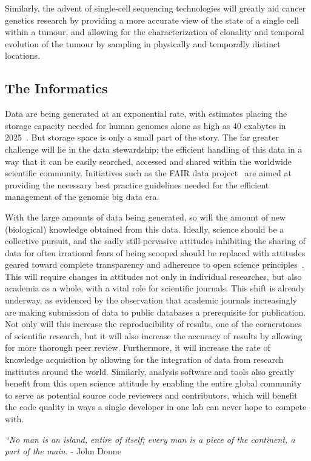 Similarly, the advent of single-cell sequencing technologies will greatly aid cancer genetics research by providing a more accurate view of the state of a single cell within a tumour, and allowing for the characterization of clonality and temporal evolution of the tumour by sampling in physically and temporally distinct locations.


\subsection{The Informatics}
Data are being generated at an exponential rate, with estimates placing the storage capacity needed for human genomes alone as high as 40 exabytes in 2025~\cite{stephens2015}. But storage space is only a small part of the story. The far greater challenge will lie in the data stewardship; the efficient handling of this data in a way that it can be easily searched, accessed and shared within the worldwide scientific community. Initiatives such as the FAIR data project~\cite{wilkinson2016fair} are aimed at providing the necessary best practice guidelines needed for the efficient management of the genomic big data era.


With the large amounts of data being generated, so will the amount of new (biological) knowledge obtained from this data. Ideally, science should be a collective pursuit, and the sadly still-pervasive attitudes inhibiting the sharing of data for often irrational fears of being scooped should be replaced with attitudes geared toward complete transparency and adherence to open science principles~\cite{TODO}. This will require changes in attitudes not only in individual researches, but also academia as a whole, with a vital role for scientific journals. This shift is already underway, as evidenced by the observation that academic journals increasingly are making submission of data to public databases a prerequisite for publication. Not only will this increase the reproducibility of results, one of the cornerstones of scientific research, but it will also increase the accuracy of results by allowing for more thorough peer review. Furthermore, it will increase the rate of knowledge acquisition by allowing for the integration of data from research institutes around the world. Similarly, analysis software and tools also greatly benefit from this open science attitude by enabling the entire global community to serve as potential source code reviewers and contributors, which will benefit the code quality in ways a single developer in one lab can never hope to compete with.


\begin{center}
\emph{“No man is an island, entire of itself; every man is a piece of the continent, a part of the main.} - John Donne
\end{center}



